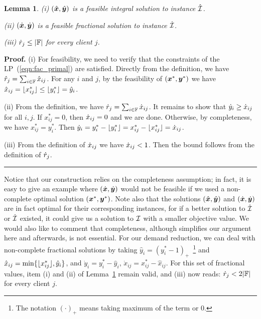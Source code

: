 \documentclass[oneside,final]{ucr}
\newtheorem{lemma}[theorem]{Lemma}
\newenvironment{proof}[1][Proof]{\textbf{#1.} }{\ \rule{0.5em}{0.5em}}
\begin{document}

\begin{lemma}\label{lem: polynomial demands partition}
{\rm (i)}
  $(\hat{\boldsymbol{x}}, \hat{\boldsymbol{y}})$ is a feasible integral solution to
  instance $\hatcalI$.

\noindent
{\rm (ii)}
  $(\dot{\boldsymbol{x}}, \dot{\boldsymbol{y}})$ is a feasible fractional
  solution to instance $\dotcalI$.

\noindent
{\rm (iii)}
${\dot r}_j\leq |\mathbb{F}|$ for every client $j$.

\end{lemma}
\begin{proof}
  (i) For feasibility, we need to verify that the
  constraints of the LP~(\ref{eqn:fac_primal}) are
  satisfied. Directly from the definition, we have ${\hat r}_j
  = \sum_{i\in\mathbb{F}} {\hat x}_{ij}$.  For any $i$ and $j$,
  by the feasibility of $(\boldsymbol{x}^\ast,\boldsymbol{y}^\ast)$ we have
  ${\hat x}_{ij} = { \lfloor x_{ij}^\ast \rfloor } \le { \lfloor y^\ast_i \rfloor } =
  {\hat y}_i$.

  (ii) From the definition, we have ${\dot r}_j =
  \sum_{i\in\mathbb{F}} {\dot x}_{ij}$.  It remains to show that
  ${\dot y}_i \geq {\dot x}_{ij}$ for all $i,j$.  If
  $x_{ij}^\ast=0$, then ${\dot x}_{ij}=0$ and we are done.
  Otherwise, by completeness, we have
  $x_{ij}^\ast=y_i^\ast$.  Then ${\dot y}_i = y_i^\ast -
  { \lfloor y_i^\ast \rfloor } = x_{ij}^\ast - { \lfloor x_{ij}^\ast \rfloor }
  ={\dot x}_{ij}$.

  (iii) From the definition of ${\dot x}_{ij}$ we have
  ${\dot x}_{ij} < 1$.  Then the bound follows from the
  definition of ${\dot r}_j$.
\end{proof}

Notice that our construction relies on the completeness
assumption; in fact, it is easy to give an example where
$(\dot{\boldsymbol{x}}, \dot{\boldsymbol{y}})$ would not be feasible if we used a
non-complete optimal solution $(\boldsymbol{x}^\ast,\boldsymbol{y}^\ast)$.  Note
also that the solutions $(\hat{\boldsymbol{x}},\hat{\boldsymbol{y}})$ and $(\dot{\boldsymbol{x}},
\dot{\boldsymbol{y}})$ are in fact optimal for their corresponding
instances, for if a better solution to $\hatcalI$ or
$\dotcalI$ existed, it could give us a solution to $\mathcal{I}$
with a smaller objective value. We would also like to
comment that completeness, although simplifies our argument
here and afterwards, is not essential. For our demand
reduction, we can deal with non-complete fractional
solutions by taking $\hat y_i = (y_i^\ast -
1)_+$~\footnote{The notation $(\cdot)_+$ means taking
  maximum of the term or 0.} and $\hat x_{ij} =
\min\{{ \lfloor x_{ij}^\ast \rfloor }, \hat y_i\}$, and $\dot y_i =
y_i^\ast - \hat y_i$, $\dot x_{ij} = x_{ij}^\ast - \hat
x_{ij}$. For this set of fractional values, item (i) and
(ii) of Lemma~\ref{lem: polynomial demands partition} remain
valid, and (iii) now reads: $\dot r_j < 2|\mathbb{F}|$ for
every client $j$.
\end{document}
